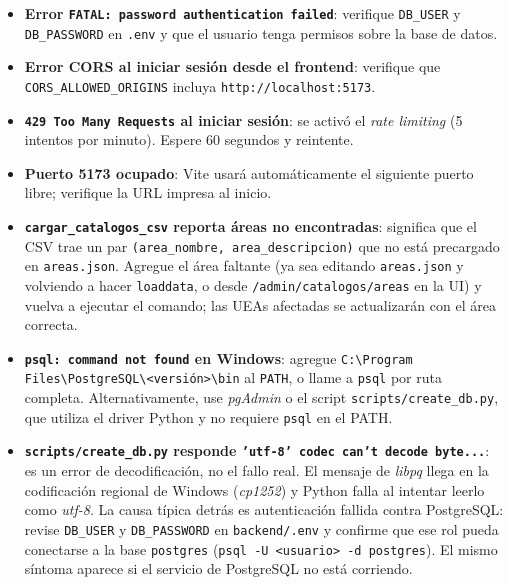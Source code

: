 \begin{itemize}
    \item \textbf{Error \texttt{FATAL: password authentication failed}}: verifique \texttt{DB\_USER} y \texttt{DB\_PASSWORD} en \texttt{.env} y que el usuario tenga permisos sobre la base de datos.
    \item \textbf{Error CORS al iniciar sesión desde el frontend}: verifique que \texttt{CORS\_ALLOWED\_ORIGINS} incluya \texttt{http://localhost:5173}.
    \item \textbf{\texttt{429 Too Many Requests} al iniciar sesión}: se activó el \emph{rate limiting} (5 intentos por minuto). Espere 60 segundos y reintente.
    \item \textbf{Puerto 5173 ocupado}: Vite usará automáticamente el siguiente puerto libre; verifique la URL impresa al inicio.
    \item \textbf{\texttt{cargar\_catalogos\_csv} reporta áreas no encontradas}: significa que el CSV trae un par \texttt{(area\_nombre, area\_descripcion)} que no está precargado en \texttt{areas.json}. Agregue el área faltante (ya sea editando \texttt{areas.json} y volviendo a hacer \texttt{loaddata}, o desde \texttt{/admin/catalogos/areas} en la UI) y vuelva a ejecutar el comando; las UEAs afectadas se actualizarán con el área correcta.
    \item \textbf{\texttt{psql: command not found} en Windows}: agregue \texttt{C:\textbackslash\allowbreak Program Files\textbackslash\allowbreak PostgreSQL\textbackslash\allowbreak<versión>\textbackslash\allowbreak bin} al \texttt{PATH}, o llame a \texttt{psql} por ruta completa. Alternativamente, use \emph{pgAdmin} o el script \texttt{scripts/create\_db.py}, que utiliza el driver Python y no requiere \texttt{psql} en el PATH.
    \item \textbf{\texttt{scripts/create\_db.py} responde \texttt{'utf-8' codec can't decode byte...}}: es un error de decodificación, no el fallo real. El mensaje de \emph{libpq} llega en la codificación regional de Windows (\emph{cp1252}) y Python falla al intentar leerlo como \emph{utf-8}. La causa típica detrás es autenticación fallida contra PostgreSQL: revise \texttt{DB\_USER} y \texttt{DB\_PASSWORD} en \texttt{backend/.env} y confirme que ese rol pueda conectarse a la base \texttt{postgres} (\texttt{psql -U <usuario> -d postgres}). El mismo síntoma aparece si el servicio de PostgreSQL no está corriendo.
\end{itemize}
